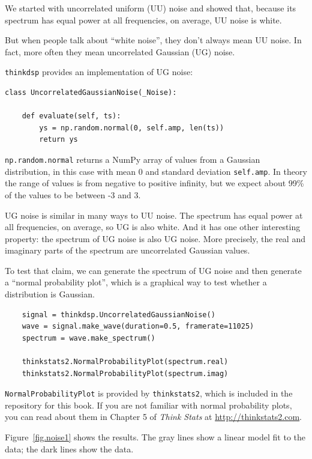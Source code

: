 \documentclass[12pt]{book}
\begin{document}
We started with uncorrelated uniform (UU) noise and showed that,
because its spectrum has equal power at all frequencies, on
average, UU noise is white.

But when people talk about ``white noise'', they don't always
mean UU noise.  In fact, more often they mean uncorrelated
Gaussian (UG) noise.

{\tt thinkdsp} provides an implementation of UG noise:

\begin{verbatim}
class UncorrelatedGaussianNoise(_Noise):

    def evaluate(self, ts):
        ys = np.random.normal(0, self.amp, len(ts))
        return ys
\end{verbatim}

{\tt np.random.normal} returns a NumPy array of values from a
Gaussian distribution, in this case with mean 0 and standard deviation
{\tt self.amp}.  In theory the range of values is from negative to
positive infinity, but we expect about 99\% of the values to be
between -3 and 3.

UG noise is similar in many ways to UU noise.  The spectrum has
equal power at all frequencies, on average, so UG is also white.
And it has one other interesting property: the spectrum of UG
noise is also UG noise.  More precisely, the real and imaginary
parts of the spectrum are uncorrelated Gaussian values.

To test that claim, we can generate the spectrum of UG noise and
then generate a ``normal probability plot'', which is a graphical
way to test whether a distribution is Gaussian.

\begin{verbatim}
    signal = thinkdsp.UncorrelatedGaussianNoise()
    wave = signal.make_wave(duration=0.5, framerate=11025)
    spectrum = wave.make_spectrum()

    thinkstats2.NormalProbabilityPlot(spectrum.real)
    thinkstats2.NormalProbabilityPlot(spectrum.imag)
\end{verbatim}

{\tt NormalProbabilityPlot} is provided by {\tt thinkstats2}, which is
included in the repository for this book.  If you are not familiar
with normal probability plots, you can read about them in Chapter 5
of {\it Think Stats} at \url{http://thinkstats2.com}.

Figure~\ref{fig.noise1} shows the results.  The gray lines
show a linear model fit to the data; the dark lines show the
data.
\end{document}
